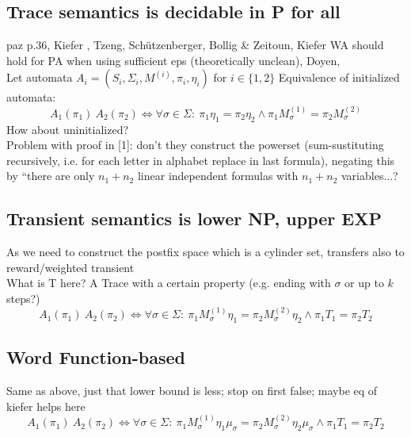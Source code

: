         \subsection{Trace semantics is decidable in P for all}
                paz p.36, Kiefer  , Tzeng, Schützenberger, Bollig \& Zeitoun, Kiefer WA should hold for PA when using sufficient eps (theoretically unclean), Doyen, \\
                Let automata $A_i = \left( S_i, \Sigma_i, M^{(i)}, \pi_i, \eta_i \right)$ for $i \in \{1, 2\}$
                Equivalence of initialized automata:
                \[ A_1(\pi_1) ~ A_2(\pi_2) \Leftrightarrow \forall \sigma \in \Sigma: \ \pi_1 \eta_1 = \pi_2 \eta_2 \wedge \pi_1 M^{(1)}_{\sigma} = \pi_2 M^{(2)}_{\sigma}  \]
                How about uninitialized? \\
                
                Problem with proof in [1]: don't they construct the powerset (sum-sustituting recursively, i.e. for each letter in alphabet replace in last formula), negating this by ``there are only $n_1+n_2$ linear independent formulas with $n_1+n_2$ variables...?
                
        \subsection{Transient semantics is lower NP, upper EXP}
            As we need to construct the postfix space which is a cylinder set, transfers also to reward/weighted transient \\
            
            What is T here? A Trace with a certain property (e.g. ending with $\sigma$ or up to $k$ steps?)
            \[ A_1(\pi_1) ~ A_2(\pi_2) \Leftrightarrow \forall \sigma \in \Sigma: \ \pi_1 M^{(1)}_{\sigma} \eta_1 = \pi_2 M^{(2)}_{\sigma} \eta_2 \wedge \pi_1 T_1 = \pi_2  T_2 \]
            
        \subsection{Word Function-based}
            Same as above, just that lower bound is less; stop on first false; maybe eq of kiefer helps here
            \[ A_1(\pi_1) ~ A_2(\pi_2) \Leftrightarrow \forall \sigma \in \Sigma: \ \pi_1 M^{(1)}_{\sigma} \eta_1 \mu_{\sigma} = \pi_2 M^{(2)}_{\sigma} \eta_2 \mu_{\sigma} \wedge \pi_1 T_1 = \pi_2  T_2 \]    
        
            
     
